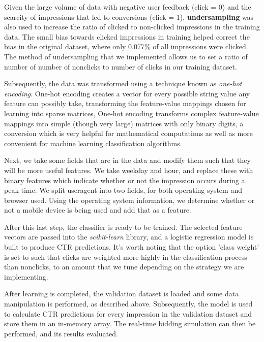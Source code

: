 \documentclass{sig-alternate-05-2015}
\begin{document}
Given the large volume of data with negative user feedback (click = 0) and the scarcity of impressions that led to conversions (click = 1), \textbf{undersampling} was also used to increase the ratio of clicked to non-clicked impressions in the training data. The small bias towards clicked impressions in training helped correct the bias in the original dataset, where only 0.077\% of all impressions were clicked. The method of undersampling that we implemented allows us to set a ratio of number of number of nonclicks to number of clicks in our training dataset.

Subsequently, the data was transformed using a technique known as \textit{one-hot encoding}. One-hot encoding creates a vector for every possible string value any feature can possibly take, transforming the feature-value mappings chosen for learning into sparse matrices, One-hot encoding transforms complex feature-value mappings into simple (though very large) matrices with only binary digits, a conversion which is very helpful for mathematical computations as well as more convenient for machine learning classification algorithms.

Next, we take some fields that are in the data and modify them such that they will be more useful features. We take weekday and hour, and replace these with binary features which indicate whether or not the impression occurs during a peak time. We split useragent into two fields, for both operating system and browser used. Using the operating system information, we determine whether or not a mobile device is being used and add that as a feature.

After this last step, the classifier is ready to be trained. The selected feature vectors are passed into the \textit{scikit-learn} library, and a logistic regression model is built to produce CTR predictions. It's worth noting that the option 'class weight' is set to such that clicks are weighted more highly in the classification process than nonclicks, to an amount that we tune depending on the strategy we are implementing.

After learning is completed, the validation dataset is loaded and some data manipulation is performed, as described above. Subsequently, the model is used to calculate CTR predictions for every impression in the validation dataset and store them in an in-memory array. The real-time bidding simulation can then be performed, and its results evaluated.
\end{document}
